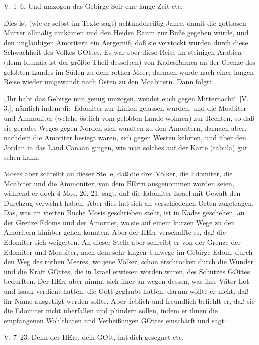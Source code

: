 \begin{schriftzitat}
V. 1–6. Und umzogen das Gebirge Seir eine lange Zeit etc.
\end{schriftzitat}

Dies ist (wie er selbst im Texte sagt) achtunddreißig Jahre, damit die gottlosen Murrer allmälig umkämen und den Heiden Raum zur Buße gegeben würde, und den ungläubigen Amoritern ein Aergerniß, daß sie verstockt würden durch diese Schwachheit des Volkes GOttes. Es war aber diese Reise im steinigen Arabien (denn Idumäa ist der größte Theil desselben) von KadesBarnea an der Grenze des gelobten Landes im Süden zu dem rothen Meer; darnach wurde nach einer langen Reise wieder umgewandt nach Osten zu den Moabitern. Dann folgt:

„Ihr habt das Gebirge nun genug umzogen, wendet euch gegen Mitternacht“ [V. 3.], nämlich indem die Edomiter zur Linken gelassen wurden, und die Moabiter und Ammoniter (welche östlich vom gelobten Lande wohnen) zur Rechten, so daß sie gerades Weges gegen Norden sich wandten zu den Amoritern, darnach aber, nachdem die Amoriter besiegt waren, sich gegen Westen kehrten, und über den Jordan in das Land Canaan gingen, wie man solches auf der Karte (tabula) gut sehen kann.

Moses aber schreibt an dieser Stelle, daß die drei Völker, die Edomiter, die Moabiter und die Ammoniter, von dem HErrn ausgenommen worden seien, während er doch 4 Mos. 20, 21. sagt, daß die Edomiter Israel mit Gewalt den Durchzug verwehrt haben. Aber dies hat sich an verschiedenen Orten zugetragen. Das, was im vierten Buche Mosis geschrieben steht, ist in Kades geschehen, an der Grenze Edoms und der Amoriter, wo sie auf einem kurzen Wege zu den Amoritern hinüber gehen konnten. Aber der HErr verschaffte es, daß die Edomiter sich weigerten. An dieser Stelle aber schreibt er von der Grenze der Edomiter und Moabiter, nach dem sehr langen Umwege im Gebirge Edom, durch den Weg des rothen Meeres, wo jene Völker, schon erschrocken durch die Wunder und die Kraft GOttes, die in Israel erwiesen worden waren, des Schutzes GOttes bedurften. Der HErr aber nimmt sich ihrer an wegen dessen, was ihre Väter Lot und Isaak verdient hatten, die Gott geglaubt hatten, darum wollte er nicht, daß ihr Name ausgetilgt werden sollte. Aber lieblich und freundlich befiehlt er, daß sie die Edomiter nicht überfallen und plündern sollen, indem er ihnen die empfangenen Wohlthaten und Verheißungen GOttes einschärft und sagt:

\begin{schriftzitat}
V. 7–23. Denn der HErr, dein GOtt, hat dich gesegnet etc.
\end{schriftzitat}

